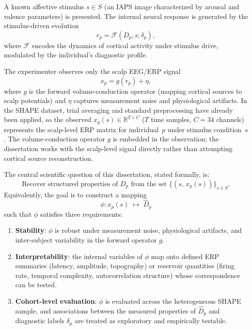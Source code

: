 A known affective stimulus $s \in S$ (an IAPS image characterized by arousal and valence parameters) is presented. The internal neural response is generated by the stimulus-driven evolution
\begin{equation}
    r_p = \mathcal{F}(D_p, s; \delta_p),
    \label{eq:forward_dynamics}
\end{equation}
where $\mathcal{F}$ encodes the dynamics of cortical activity under stimulus drive, modulated by the individual's diagnostic profile.

The experimenter observes only the scalp EEG/ERP signal
\begin{equation}
    x_p = g(r_p) + \eta,
    \label{eq:observation}
\end{equation}
where $g$ is the forward volume-conduction operator (mapping cortical sources to scalp potentials) and $\eta$ captures measurement noise and physiological artifacts. In the SHAPE dataset, trial averaging and standard preprocessing have already been applied, so the observed $x_p(s) \in \mathbb{R}^{T \times C}$ ($T$ time samples, $C = 34$ channels) represents the scalp-level ERP matrix for individual~$p$ under stimulus condition~$s$. The volume-conduction operator $g$ is embedded in the observation; the dissertation works with the scalp-level signal directly rather than attempting cortical source reconstruction.

The central scientific question of this dissertation, stated formally, is:
\begin{equation}
    \text{Recover structured properties of } D_p \text{ from the set } \{(s,\, x_p(s))\}_{s \in S}.
    \label{eq:inverse_problem}
\end{equation}
Equivalently, the goal is to construct a mapping
\begin{equation}
    \phi: x_p(s) \;\mapsto\; \hat{D}_p
    \label{eq:phi}
\end{equation}
such that $\phi$ satisfies three requirements:
\begin{enumerate}
    \item \textbf{Stability}: $\phi$ is robust under measurement noise, physiological artifacts, and inter-subject variability in the forward operator $g$.
    \item \textbf{Interpretability}: the internal variables of $\phi$ map onto defined ERP summaries (latency, amplitude, topography) or reservoir quantities (firing rate, temporal complexity, autocorrelation structure) whose correspondence can be tested.
    \item \textbf{Cohort-level evaluation}: $\phi$ is evaluated across the heterogeneous SHAPE sample, and associations between the measured properties of $\hat{D}_p$ and diagnostic labels $\delta_p$ are treated as exploratory and empirically testable.
\end{enumerate}

